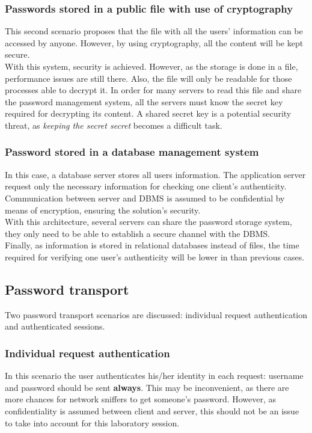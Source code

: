 \subsubsection*{Passwords stored in a public file with use of cryptography}\label{subsubsec:pwdstore2}
This second scenario proposes that the file with all the users' information can be accessed by anyone. However, by using cryptography, all the content will be kept secure.\\
With this system, security is achieved. However, as the storage is done in a file, performance issues are still there. Also, the file will only be readable for those processes able to decrypt it. In order for many servers to read this file and share the password management system, all the servers must know the secret key required for decrypting its content. A shared secret key is a potential security threat, as \textit{keeping the secret secret} becomes a difficult task.
\subsubsection*{Password stored in a database management system}\label{subsubsec:pwdstore3}
In this case, a database server stores all users information. The application server request only the necessary information for checking one client's authenticity.\\
Communication between server and DBMS is assumed to be confidential by means of encryption, ensuring the solution's security.\\
With this architecture, several servers can share the password storage system, they only need to be able to establish a secure channel with the DBMS.\\
Finally, as information is stored in relational databases instead of files, the time required for verifying one user's authenticity will be lower in than previous cases.
\subsection{Password transport}\label{subsec:pwdtrans}
Two password transport scenarios are discussed: individual request authentication and authenticated sessions.
\subsubsection*{Individual request authentication}\label{pwdtrans1}
In this scenario the user authenticates his/her identity in each request: username and password should be sent \textbf{always}. This may be inconvenient, as there are more chances for network sniffers to get someone's password. However, as confidentiality is assumed between client and server, this should not be an issue to take into account for this laboratory session.
